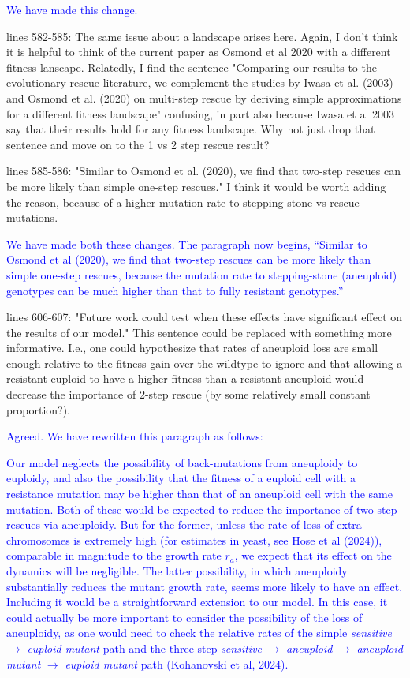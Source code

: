 \documentclass[12pt]{extarticle}
\begin{document}
\textcolor{blue}{We have made this change.}

lines 582-585: The same issue about a landscape arises here. Again, I don't think it is helpful to think of the current paper as Osmond et al 2020 with a different fitness lanscape. Relatedly, I find the sentence "Comparing our results to the evolutionary rescue literature, we complement the studies by Iwasa et al. (2003) and Osmond et al. (2020) on multi-step rescue by deriving simple approximations for a different fitness landscape" confusing, in part also because Iwasa et al 2003 say that their results hold for any fitness landscape. Why not just drop that sentence and move on to the 1 vs 2 step rescue result?

lines 585-586: "Similar to Osmond et al. (2020), we find that two-step rescues can be more likely than simple one-step rescues." I think it would be worth adding the reason, because of a higher mutation rate to stepping-stone vs rescue mutations.

\textcolor{blue}{We have made both these changes. The paragraph now begins, ``Similar to Osmond et al (2020), we find that two-step rescues can be more likely than simple one-step rescues, because the mutation rate to stepping-stone (aneuploid) genotypes can be much higher than that to fully resistant genotypes.''}

lines 606-607: "Future work could test when these effects have significant effect on the results of our model." This sentence could be replaced with something more informative. I.e., one could hypothesize that rates of aneuploid loss are small enough relative to the fitness gain over the wildtype to ignore and that allowing a resistant euploid to have a higher fitness than a resistant aneuploid would decrease the importance of 2-step rescue (by some relatively small constant proportion?).

\textcolor{blue}{Agreed. We have rewritten this paragraph as follows:
\begin{displayquote}
    Our model neglects the possibility of back-mutations from aneuploidy to euploidy, and also the possibility that the fitness of a euploid cell with a resistance mutation may be higher than that of an aneuploid cell with the same mutation. 
    Both of these would be expected to reduce the importance of two-step rescues via aneuploidy.
    But for the former, unless the rate of loss of extra chromosomes is extremely high (for estimates in yeast, see Hose et al (2024)), comparable in magnitude to the growth rate $r_a$, we expect that its effect on the dynamics will be negligible.
    The latter possibility, in which aneuploidy substantially reduces the mutant growth rate, seems more likely
    to have an effect. 
    Including it would be a straightforward extension to our model.
    In this case, it could actually be more important to consider the possibility of the loss of aneuploidy, 
    as one would need to check the relative rates of the simple \textit{sensitive} $\rightarrow$ \textit{euploid mutant} path and the three-step \textit{sensitive} $\rightarrow$ \textit{aneuploid} $\rightarrow$ \textit{aneuploid mutant} $\rightarrow$ \textit{euploid mutant} path (Kohanovski et al, 2024).
\end{displayquote}
}
\end{document}
